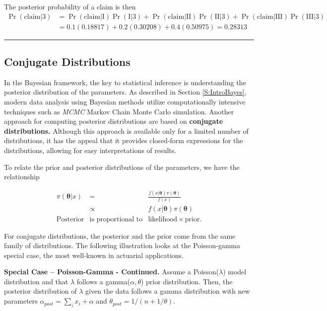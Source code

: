 \documentclass[]{book}
\theoremstyle{definition}
\theoremstyle{definition}
\theoremstyle{definition}
\theoremstyle{remark}
\begin{document}
The posterior probability of a claim is then \[
\begin{aligned} 
\Pr(\text{claim} | 3) &= \Pr(\text{claim}|\text{I})\Pr(\text{I} | 3) + \Pr(\text{claim} | \text{II})\Pr(\text{II} | 3) + \Pr(\text{claim} | \text{III}) \Pr(\text{III} | 3) \\ 
&= 0.1(0.18817) + 0.2(0.30208) + 0.4(0.50975) = 0.28313
\end{aligned}
\]

\begin{center}\rule{0.5\linewidth}{\linethickness}\end{center}

\subsection{Conjugate Distributions}\label{S:ConjugateDistributions}

In the Bayesian framework, the key to statistical inference is
understanding the posterior distribution of the parameters. As described
in Section \ref{S:IntroBayes}, modern data analysis using Bayesian
methods utilize computationally intensive techniques such as
\emph{MCMC}{ Markov Chain Monte Carlo} simulation. Another approach for
computing posterior distributions are based on \textbf{conjugate
distributions.} Although this approach is available only for a limited
number of distributions, it has the appeal that it provides closed-form
expressions for the distributions, allowing for easy interpretations of
results.

To relate the prior and posterior distributions of the parameters, we
have the relationship

\[\begin{array}{ccc}
\pi(\boldsymbol \theta | x) & = & \frac{f(x|\boldsymbol \theta )\pi(\boldsymbol \theta)}{f(x)}  \\
 & \propto  & f(x|\boldsymbol \theta ) \pi(\boldsymbol \theta) \\
\text{Posterior} & \text{is proportional to} & \text{likelihood} \times \text{prior} .
\end{array}\]

For conjugate distributions, the posterior and the prior come from the
same family of distributions. The following illustration looks at the
Poisson-gamma special case, the most well-known in actuarial
applications.

\textbf{Special Case -- Poisson-Gamma - Continued.} Assume a
Poisson(\(\lambda\)) model distribution and that \(\lambda\) follows a
gamma(\(\alpha, \theta\)) prior distribution. Then, the posterior
distribution of \(\lambda\) given the data follows a gamma distribution
with new parameters \(\alpha_{post} = \sum_i x_i + \alpha\) and
\(\theta_{post} = 1/(n + 1/\theta)\).
\end{document}
